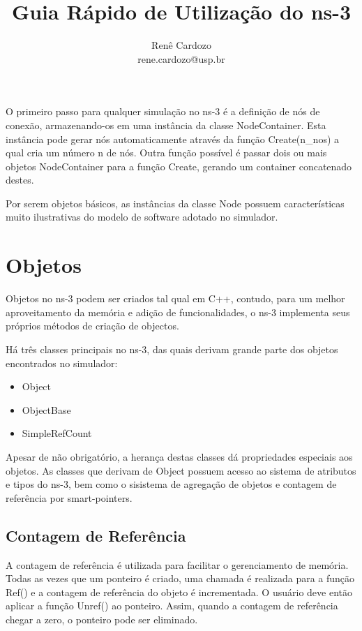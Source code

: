 \documentclass[14pt]{extarticle}
\author{Renê Cardozo \\ 
        rene.cardozo@usp.br}
\title{Guia Rápido de Utilização do ns-3}
\date{}
\begin{document}
\maketitle

O primeiro passo para qualquer simulação no ns-3 é a definição de nós de conexão, armazenando-os em uma instância da
classe NodeContainer. Esta instância pode gerar nós automaticamente através da função Create(n\_nos) a qual cria
um número n de nós. Outra função possível é passar dois ou mais objetos NodeContainer para a função Create, gerando um
container concatenado destes.

Por serem objetos básicos, as instâncias da classe Node possuem características muito ilustrativas do modelo de software
adotado no simulador.

\section{Objetos}
Objetos no ns-3 podem ser criados tal qual em C++, contudo, para um melhor aproveitamento da memória e adição de
funcionalidades, o ns-3 implementa seus próprios métodos de criação de objectos.

Há três classes principais no ns-3, das quais derivam grande parte dos objetos encontrados no simulador:

\begin{itemize}
    \item Object
    \item ObjectBase
    \item SimpleRefCount
\end{itemize}

Apesar de não obrigatório, a herança destas classes dá propriedades especiais aos objetos. As classes que derivam de
Object possuem acesso ao sistema de atributos e tipos do ns-3, bem como o sisistema de agregação de objetos e contagem
de referência por smart-pointers.

\subsection{Contagem de Referência}

A contagem de referência é utilizada para facilitar o gerenciamento de memória. Todas as vezes que um ponteiro é
criado, uma chamada é realizada para a função Ref() e a contagem de referência do objeto é incrementada. O usuário deve
então aplicar a função Unref() ao ponteiro. Assim, quando a contagem de referência chegar a zero, o ponteiro pode ser
eliminado.
\end{document}
